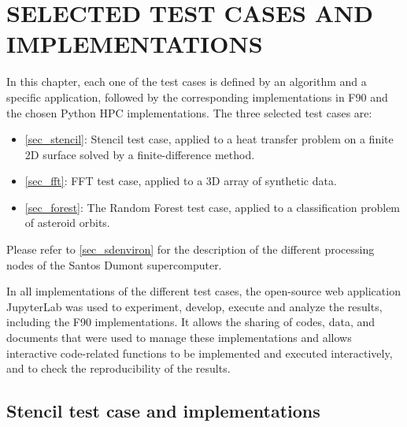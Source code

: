 \chapter{SELECTED TEST CASES AND IMPLEMENTATIONS}
\label{ch_cases}

In this chapter, each one of the test cases is defined by an algorithm and a specific application, followed by the corresponding implementations in F90 and the chosen Python HPC implementations. The three selected test cases are:   

\begin{itemize}

\item\autoref {sec_stencil}: Stencil test case, applied to a heat transfer problem on a finite 2D surface solved by a finite-difference method.

\item\autoref {sec_fft}: FFT test case, applied to a 3D array of synthetic data.

\item\autoref {sec_forest}: The Random Forest test case, applied to a classification problem of asteroid orbits.

\end{itemize}

Please refer to \autoref {sec_sdenviron} for the description of the different processing nodes of the Santos Dumont supercomputer. 

In all implementations of the different test cases, the open-source web application JupyterLab was used to experiment, develop, execute and analyze the results, including the F90 implementations. It allows the sharing of codes, data, and documents that were used to manage these implementations and allows interactive code-related functions to be implemented and executed interactively, and to check the reproducibility of the results.

%
%
%
%
%
%
%
\section{Stencil test case and implementations}
\label{sec_stencil}

